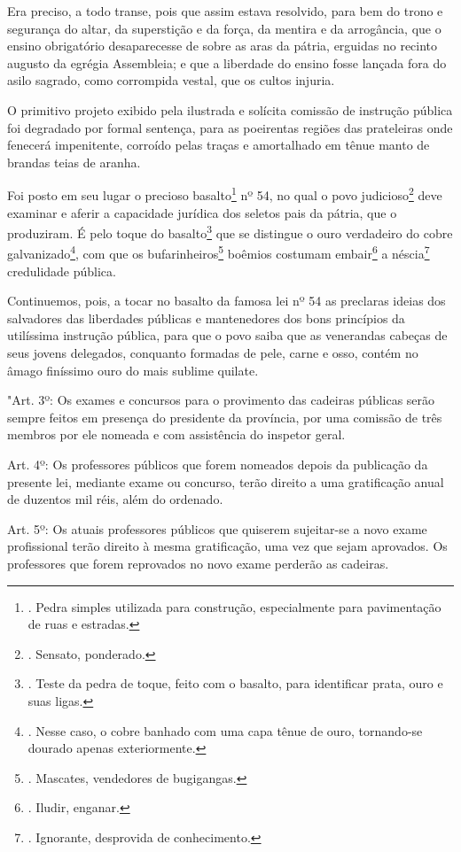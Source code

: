 Era preciso, a todo transe, pois que assim estava resolvido, para bem do
trono e segurança do altar, da superstição e da força, da mentira e da
arrogância, que o ensino obrigatório desaparecesse de sobre as aras da
pátria, erguidas no recinto augusto da egrégia Assembleia; e que a
liberdade do ensino fosse lançada fora do asilo sagrado, como corrompida
vestal, que os cultos injuria.

O primitivo projeto exibido pela ilustrada e solícita comissão de
instrução pública foi degradado por formal sentença, para as poeirentas
regiões das prateleiras onde fenecerá impenitente, corroído pelas traças
e amortalhado em tênue manto de brandas teias de aranha.

Foi posto em seu lugar o precioso basalto\footnote{. Pedra simples
  utilizada para construção, especialmente para pavimentação de ruas e
  estradas.} nº 54, no qual o povo judicioso\footnote{. Sensato,
  ponderado.} deve examinar e aferir a capacidade jurídica dos seletos
pais da pátria, que o produziram. É pelo toque do basalto\footnote{.
  Teste da pedra de toque, feito com o basalto, para identificar prata,
  ouro e suas ligas.} que se distingue o ouro verdadeiro do cobre
galvanizado\footnote{. Nesse caso, o cobre banhado com uma capa tênue de
  ouro, tornando-se dourado apenas exteriormente.}, com que os
bufarinheiros\footnote{. Mascates, vendedores de bugigangas.} boêmios
costumam embair\footnote{. Iludir, enganar.} a néscia\footnote{.
  Ignorante, desprovida de conhecimento.} credulidade pública.

Continuemos, pois, a tocar no basalto da famosa lei nº 54 as preclaras
ideias dos salvadores das liberdades públicas e mantenedores dos bons
princípios da utilíssima instrução pública, para que o povo saiba que as
venerandas cabeças de seus jovens delegados, conquanto formadas de pele,
carne e osso, contém no âmago finíssimo ouro do mais sublime quilate.

"Art. 3º: Os exames e concursos para o provimento das cadeiras públicas
serão sempre feitos em presença do presidente da província, por uma
comissão de três membros por ele nomeada e com assistência do inspetor
geral.

Art. 4º: Os professores públicos que forem nomeados depois da publicação
da presente lei, mediante exame ou concurso, terão direito a uma
gratificação anual de duzentos mil réis, além do ordenado.

Art. 5º: Os atuais professores públicos que quiserem sujeitar-se a novo
exame profissional terão direito à mesma gratificação, uma vez que sejam
aprovados. Os professores que forem reprovados no novo exame perderão as
cadeiras.


